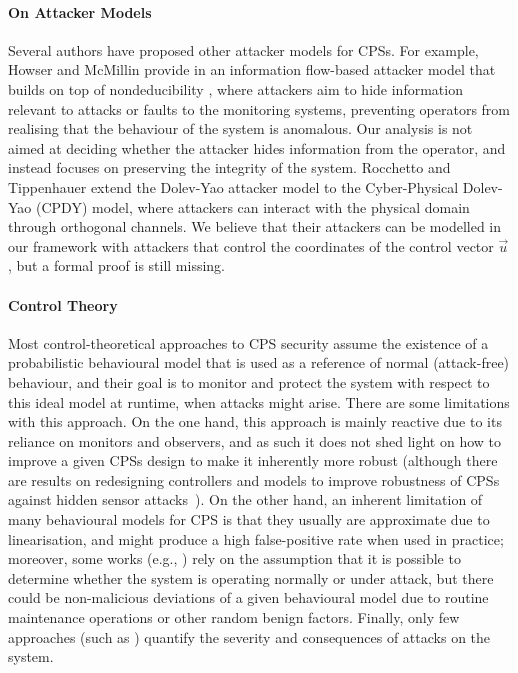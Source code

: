 {{\paragraph{On Attacker Models} Several authors have proposed other attacker models for CPSs. For example, Howser and McMillin provide in \cite{StuxnetOnCPS} an information flow-based attacker model that builds on top of nondeducibility \cite{Nondeducibility}, where attackers aim to hide information relevant to attacks or faults to the monitoring systems, preventing operators from realising that the behaviour of the system is anomalous. Our analysis is not aimed at deciding whether the attacker hides information from the operator, and instead focuses on preserving the integrity of the system. Rocchetto and Tippenhauer \cite{CPSDolevYao} extend the Dolev-Yao attacker model \cite{DolevYao} to the Cyber-Physical Dolev-Yao (CPDY) model, where attackers can interact with the physical domain through orthogonal channels. We believe that their attackers can be modelled in our framework with attackers that control the coordinates of the control vector $\vec{u}$, but a formal proof is still missing.
}

\paragraph{Control Theory} 
Most control-theoretical approaches to CPS security assume the existence of a probabilistic behavioural model that is used as a reference of normal (attack-free) behaviour, and their goal is to monitor and protect the system with respect to this ideal model at runtime, when attacks might arise. There are some limitations with this approach. On the one hand, this approach is mainly reactive due to its reliance on monitors and observers, and as such it does not shed light on how to improve a given CPSs design to make it inherently more robust (although there are results on {redesigning controllers and models} to improve robustness of CPSs against hidden sensor attacks~\cite{ReachableSets,Weerakkody}). On the other hand, an inherent limitation of many behavioural models for CPS is that they usually are approximate due to linearisation, and might produce a high false-positive rate when used in practice; moreover, some works (e.g., \cite{Urbina2016,CPSDetectingIntegrityAttacksScada,IFCPSSec}) rely on the assumption that it is possible to determine whether the system is operating normally or under attack, but there could be non-malicious deviations of a given behavioural model due to routine maintenance operations or other random benign factors. Finally, only few approaches (such as \cite{IFCPSSec,Gupta2,ReachableSets}) quantify the severity and consequences of attacks on the system. 

}
